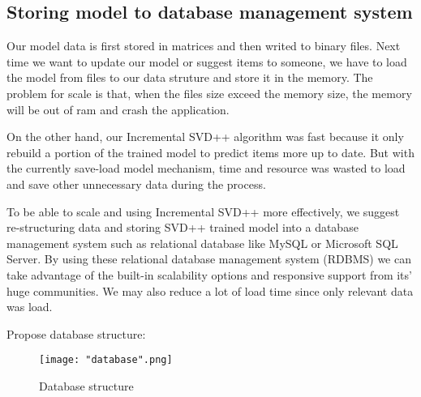 \documentclass[oneside,13pt]{extreport}
\begin{document}
\subsection{Storing model to database management system}

Our model data is first stored in matrices and then writed to binary files. Next time we want to update our model or suggest items to someone, we have to load the model from files to our data struture and store it in the memory. The problem for scale is that, when the files size exceed the memory size, the memory will be out of ram and crash the application.

On the other hand, our Incremental SVD++ algorithm was fast because it only rebuild a portion of the trained model to predict items more up to date. But with the currently save-load model mechanism, time and resource was wasted to load and save other unnecessary data during the process.

To be able to scale and using Incremental SVD++ more effectively, we suggest re-structuring data and storing SVD++ trained model into a database management system such as relational database like MySQL or Microsoft SQL Server. By using these relational database management system (RDBMS) we can take advantage of the built-in scalability options and responsive support from its' huge communities. We may also reduce a lot of load time since only relevant data was load.

Propose database structure: 

\begin{figure}[h!]
    \centering
    \texttt{[image: "database".png]} 
    \caption{Database structure}
    \label{fig:database}
\end{figure}



\vfill
{}
\end{document}
